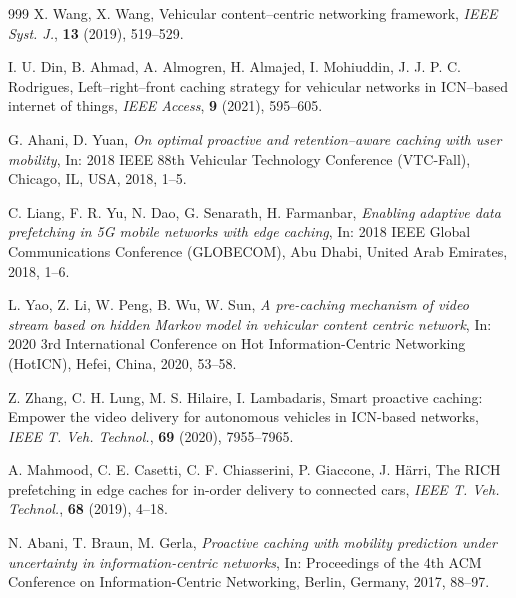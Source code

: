 \documentclass{aims}
\numberwithin{equation}{section}
\begin{document}
\begin{thebibliography}{999}
 X. Wang, X. Wang,  Vehicular content--centric networking framework,  \emph{IEEE Syst. J.}, \textbf{13} (2019), 519--529. 

 I. U. Din, B. Ahmad, A. Almogren, H. Almajed, I. Mohiuddin, J. J. P. C. Rodrigues,   Left--right--front caching strategy for vehicular networks in ICN--based internet of things,  \textit{IEEE Access}, \textbf{9} (2021), 595--605. 

 G. Ahani, D. Yuan,  \emph{On optimal proactive and retention--aware caching with user mobility},  In: 2018 IEEE 88th Vehicular Technology Conference (VTC-Fall), Chicago, IL, USA, 2018, 1--5. 

 C. Liang, F. R. Yu, N. Dao, G. Senarath, H. Farmanbar,  \emph{Enabling adaptive data prefetching in 5G mobile networks with edge caching},  In: 2018 IEEE Global Communications Conference (GLOBECOM), Abu Dhabi, United Arab Emirates, 2018, 1--6. 

 L. Yao, Z. Li, W. Peng, B. Wu, W. Sun,  \emph{A pre-caching mechanism of video stream based on hidden Markov model in vehicular content centric network},  In: 2020 3rd International Conference on Hot Information-Centric Networking (HotICN), Hefei, China, 2020,  53--58. 

 Z. Zhang, C. H. Lung, M. S. Hilaire, I. Lambadaris,  Smart proactive caching: Empower the video delivery for autonomous vehicles in ICN-based networks,  \emph{IEEE T. Veh. Technol.}, \textbf{69} (2020), 7955--7965. 

 A. Mahmood, C. E. Casetti, C. F. Chiasserini, P. Giaccone, J. Härri,  The RICH prefetching in edge caches for in-order delivery to connected cars,  \emph{IEEE T. Veh. Technol.}, \textbf{68} (2019), 4--18. 

 N. Abani, T. Braun, M. Gerla,  \emph{Proactive caching with mobility prediction under uncertainty in information-centric networks}, In: Proceedings of the 4th ACM Conference on Information-Centric Networking, Berlin, Germany, 2017, 88--97. 


\end{thebibliography}
\end{document}
